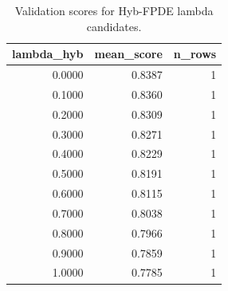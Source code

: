 \begin{table}[t]
\caption{Validation scores for Hyb-FPDE lambda candidates.}
\label{tab:lambda_distribution_computed}
\centering
\begin{tabular}{rrr}
\toprule
lambda\_hyb & mean\_score & n\_rows \\
\midrule
0.0000 & 0.8387 & 1 \\
0.1000 & 0.8360 & 1 \\
0.2000 & 0.8309 & 1 \\
0.3000 & 0.8271 & 1 \\
0.4000 & 0.8229 & 1 \\
0.5000 & 0.8191 & 1 \\
0.6000 & 0.8115 & 1 \\
0.7000 & 0.8038 & 1 \\
0.8000 & 0.7966 & 1 \\
0.9000 & 0.7859 & 1 \\
1.0000 & 0.7785 & 1 \\
\bottomrule
\end{tabular}

\end{table}
